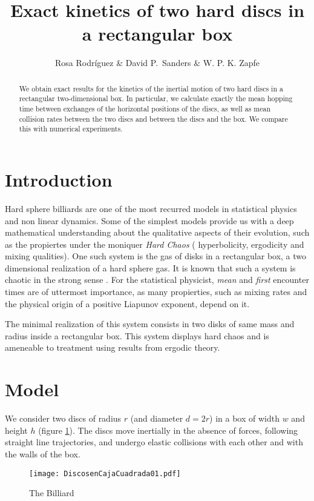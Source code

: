 \documentclass[a4paper,10pt]{article}
\title{Exact kinetics of two hard discs in a rectangular box}
\author{Rosa Rodríguez \& David P.~Sanders \& W. P. K. Zapfe}
\affiliation{Departamento de Física, Facultad de Ciencias, Universidad Nacional Autónoma de México, Ciudad Universitaria, Del.~Coyoacán, México D.F. 04510, Mexico}
\begin{document}
\maketitle
\begin{abstract}
  We obtain exact results for the kinetics of the inertial motion of 
two hard discs in a rectangular two-dimensional box.
  In particular,  we calculate exactly the mean hopping time between exchanges
 of the horizontal positions of the discs, 
as well as mean collision rates between the two discs and 
 between the discs and the box. We compare this with numerical experiments.
\end{abstract}

\section{Introduction}

Hard sphere billiards are one of the most recurred models in
statistical physics and non linear dynamics.  Some of the simplest models
 provide us with a deep mathematical understanding
about the qualitative aspects of their evolution, such as 
the propiertes under the moniquer \emph{Hard Chaos} (
hyperbolicity, ergodicity and mixing qualities). One such system is the
gas of disks in a rectangular box, a two dimensional realization of a
hard sphere gas. It is known that such a system is chaotic in the
strong sense \cite{Sinai70}. 
For the statistical physicist, \emph{mean} and \emph{first} encounter
times are of uttermost importance, as many propierties,
such as mixing rates and the physical origin of a positive
Liapunov exponent, depend on it. 

The minimal realization of this
system consists in two disks of same mass and radius inside a 
rectangular box. This system displays hard chaos and 
is ameneable to treatment using
results from ergodic theory. 


\section{Model}

We consider two discs of radius $r$ (and diameter $d=2r$) 
in a box of width $w$ and height $h$ (figure
\ref{billar01}). 
The discs move inertially in the absence of forces, 
following straight line trajectories,
and undergo elastic collisions with each 
other and with the walls of the box.

\begin{figure}[h]
  \centering
  \texttt{[image: DiscosenCajaCuadrada01.pdf]}
  \caption{The Billiard}\label{billar01}
\end{figure}
\end{document}
